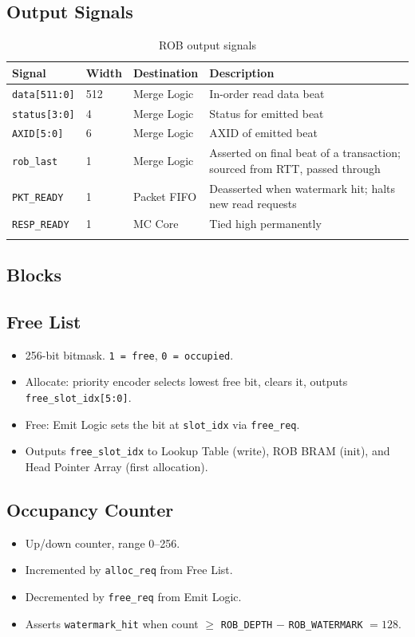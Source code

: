 \subsection*{Output Signals}
\begin{longtable}{p{3cm}p{1cm}p{3cm}p{7cm}}
\toprule
\textbf{Signal} & \textbf{Width} & \textbf{Destination} & \textbf{Description} \\
\midrule
\texttt{data[511:0]}    & 512 & Merge Logic  & In-order read data beat \\
\texttt{status[3:0]}    & 4   & Merge Logic  & Status for emitted beat \\
\texttt{AXID[5:0]}      & 6   & Merge Logic  & AXID of emitted beat \\
\texttt{rob\_last}      & 1   & Merge Logic  & Asserted on final beat of a transaction; sourced from RTT, passed through \\
\texttt{PKT\_READY}     & 1   & Packet FIFO  & Deasserted when watermark hit; halts new read requests \\
\texttt{RESP\_READY}    & 1   & MC Core      & Tied high permanently \\
\bottomrule
\caption{ROB output signals}
\end{longtable}

\subsection{Blocks}

\subsection{Free List}
\begin{itemize}[noitemsep]
  \item 256-bit bitmask. \texttt{1 = free}, \texttt{0 = occupied}.
  \item Allocate: priority encoder selects lowest free bit, clears it, outputs \texttt{free\_slot\_idx[5:0]}.
  \item Free: Emit Logic sets the bit at \texttt{slot\_idx} via \texttt{free\_req}.
  \item Outputs \texttt{free\_slot\_idx} to Lookup Table (write), ROB BRAM (init), and Head Pointer Array (first allocation).
\end{itemize}

\subsection{Occupancy Counter}
\begin{itemize}[noitemsep]
  \item Up/down counter, range 0--256.
  \item Incremented by \texttt{alloc\_req} from Free List.
  \item Decremented by \texttt{free\_req} from Emit Logic.
  \item Asserts \texttt{watermark\_hit} when count $\geq$ \texttt{ROB\_DEPTH} $-$ \texttt{ROB\_WATERMARK} $= 128$.
\end{itemize}

